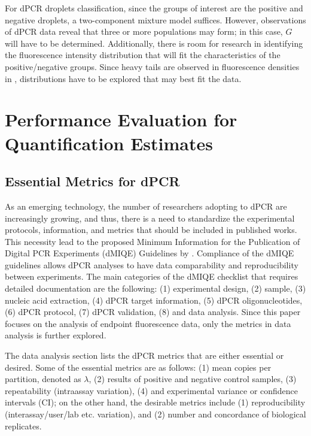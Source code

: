 For dPCR droplets classification, since the groups of interest are the positive and negative droplets, a two-component mixture model suffices. However, observations of dPCR data reveal that three or more populations may form; in this case, \(G\) will have to be determined. Additionally, there is room for research in identifying the fluorescence intensity distribution that will fit the characteristics of the positive/negative groups. Since heavy tails are observed in fluorescence densities in , distributions have to be explored that may best fit the data. 


\section{Performance Evaluation for Quantification Estimates}
\label{sec:ch2_perfeval_estimates}

\subsection{Essential Metrics for dPCR}
\label{sec:ch2_perfeval_essentialMetrics}
As an emerging technology, the number of researchers adopting to dPCR are increasingly growing, and thus, there is a need to standardize the experimental protocols, information, and metrics that should be included in published works. This necessity lead to the proposed Minimum Information for the Publication of Digital PCR Experiments (dMIQE) Guidelines by . Compliance of the dMIQE guidelines allows dPCR analyses to have data comparability and reproducibility between experiments. The main categories of the dMIQE checklist that requires detailed documentation are the following: (1) experimental design, (2) sample, (3) nucleic acid extraction, (4) dPCR target information, (5) dPCR oligonucleotides, (6) dPCR protocol, (7) dPCR validation, (8) and data analysis. Since this paper focuses on the analysis of endpoint fluorescence data, only the metrics in data analysis is further explored.

The data analysis section lists the dPCR metrics that are either essential or desired. Some of the essential metrics are as follows: (1) mean copies per partition, denoted as \(\lambda\), (2) results of positive and negative control samples, (3) repeatability (intraassay variation), (4) and experimental variance or confidence intervals (CI); on the other hand, the desirable metrics include (1) reproducibility (interassay/user/lab etc. variation), and (2) number and concordance of biological replicates. 

